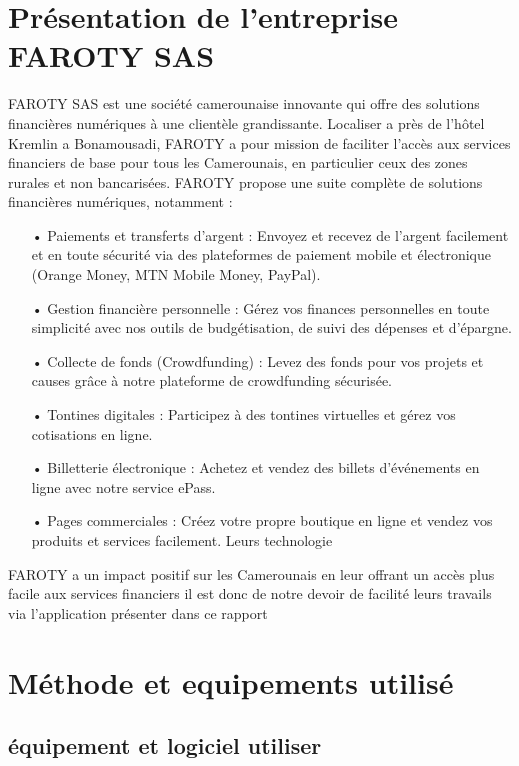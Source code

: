 \documentclass[a4paper,12pt]{report}
\begin{document}
\chapter{Présentation de l'entreprise FAROTY SAS} 
FAROTY SAS est une société camerounaise innovante qui offre des solutions financières numériques à une clientèle grandissante. Localiser a près de l’hôtel Kremlin a Bonamousadi, FAROTY a pour mission de faciliter l'accès aux services financiers de base pour tous les Camerounais, en particulier ceux des zones rurales et non bancarisées.
FAROTY propose une suite complète de solutions financières numériques, notamment :
\begin{itemize}
  \item[•] Paiements et transferts d'argent : Envoyez et recevez de l'argent facilement et en toute sécurité via des plateformes de paiement mobile et électronique (Orange Money, MTN Mobile Money, PayPal). 
  \item[•] Gestion financière personnelle : Gérez vos finances personnelles en toute simplicité avec nos outils de budgétisation, de suivi des dépenses et d'épargne. 
  \item[•] Collecte de fonds (Crowdfunding) : Levez des fonds pour vos projets et causes grâce à notre plateforme de crowdfunding sécurisée. 
  \item[•] Tontines digitales : Participez à des tontines virtuelles et gérez vos cotisations en ligne. 
  \item[•] Billetterie électronique : Achetez et vendez des billets d'événements en ligne avec notre service ePass. 
  \item[•] Pages commerciales : Créez votre propre boutique en ligne et vendez vos produits et services facilement. 
  Leurs technologie
\end{itemize} 
FAROTY a un impact positif sur les Camerounais en leur offrant un accès plus facile aux services financiers il est donc de notre devoir de facilité leurs travails via l'application présenter dans ce rapport

\chapter{Méthode et equipements utilisé}
\section{équipement et logiciel utiliser}
\end{document}
